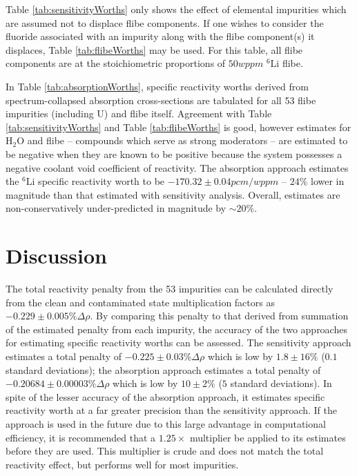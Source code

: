 \documentclass[11pt]{article}
\newcommand{\iso}[2]{$^{#2}\mathrm{#1}$}
\newcommand{\tild}[0]{\sim\!\!}
\newcommand{\water}[0]{$\mathrm{H_2O}$}
\begin{document}
Table \ref{tab:sensitivityWorths} only shows the effect of elemental impurities which are assumed not to displace flibe components.
If one wishes to consider the fluoride associated with an impurity along with the flibe component(s) it displaces, Table \ref{tab:flibeWorths} may be used.
For this table, all flibe components are at the stoichiometric proportions of $50wppm$ \iso{Li}{6} flibe.

In Table \ref{tab:absorptionWorths}, specific reactivity worths derived from spectrum-collapsed absorption cross-sections are tabulated for all 53 flibe impurities (including U) and flibe itself.
Agreement with Table \ref{tab:sensitivityWorths} and Table \ref{tab:flibeWorths} is good, however estimates for \water{} and flibe -- compounds which serve as strong moderators -- are estimated to be negative when they are known to be positive because the system possesses a negative coolant void coefficient of reactivity.
The absorption approach estimates the \iso{Li}{6} specific reactivity worth to be $-170.32\pm0.04pcm/wppm$ -- $24\%$ lower in magnitude than that estimated with sensitivity analysis.
Overall, estimates are non-conservatively under-predicted in magnitude by $\tild 20\%$.

\section{Discussion}
\label{sec:discussion}

The total reactivity penalty from the 53 impurities can be calculated directly from the clean and contaminated state multiplication factors as $-0.229\pm0.005 \%\Delta\rho$.
By comparing this penalty to that derived from summation of the estimated penalty from each impurity, the accuracy of the two approaches for estimating specific reactivity worths can be assessed.
The sensitivity approach estimates a total penalty of $-0.225\pm0.03 \%\Delta\rho$ which is low by $1.8\pm16\%$ ($0.1$ standard deviations); the absorption approach estimates a total penalty of $-0.20684\pm0.00003 \%\Delta\rho$ which is low by $10\pm2\%$ ($5$ standard deviations).
In spite of the lesser accuracy of the absorption approach, it estimates specific reactivity worth at a far greater precision than the sensitivity approach.
If the approach is used in the future due to this large advantage in computational efficiency, it is recommended that a $1.25\times$ multiplier be applied to its estimates before they are used.
This multiplier is crude and does not match the total reactivity effect, but performs well for most impurities.
\end{document}
